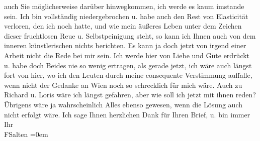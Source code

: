 \begin{ledgroupsized}[t]{13cm}
               auch Sie möglicher{\pb}weise darüber hinwegkommen, ich werde
               es kaum imstande sein. Ich bin vollständig niedergebrochen u. habe auch
               den Rest von Elasticität verloren, den ich noch hatte, und wie mein äußeres
               Leben unter dem Zeichen dieser fruchtlosen
               Reue u. Selbstpeinigung steht, so kann ich Ihnen auch von dem inneren
               künstlerischen nichts berichten. Es kann ja doch jetzt von irgend einer 
               Arbeit nicht die Rede bei mir sein.\pend
           \pstart
           Ich werde hier von Liebe und {\pb}Güte erdrückt u. habe doch
               Beides nie so wenig ertragen, als gerade jetzt, ich wäre auch längst
               fort von hier, wo ich den Leuten durch meine consequente Verstimmung
               auffalle, wenn nicht der Gedanke an Wien noch so
               schrecklich für mich wäre.\pend
           \pstart
           Auch zu Richard u. Loris wäre ich
               längst gefahren, aber wie soll ich jetzt mit ihnen reden? Übrigens wäre ja wahrscheinlich
               Alles ebenso gewesen, wenn die Lösung auch nicht erfolgt wäre.\pend
           \pstart
           Ich sage Ihnen herzlichen Dank für Ihren Brief, u. {\pb}bin
               immer\pend
           \pstart
           Ihr {\\[\baselineskip]}\spacefill\mbox{FSalten}\pend
           \leftskip=0em{}
         
         \endnumbering{}\end{ledgroupsized}  \newcommand{\dateiname}{L03113}\newcommand{\titel}{Felix Salten an Arthur Schnitzler, 23. 8. 1892}\newcommand{\editorInnen}{Martin Anton Müller und Laura Untner}
      